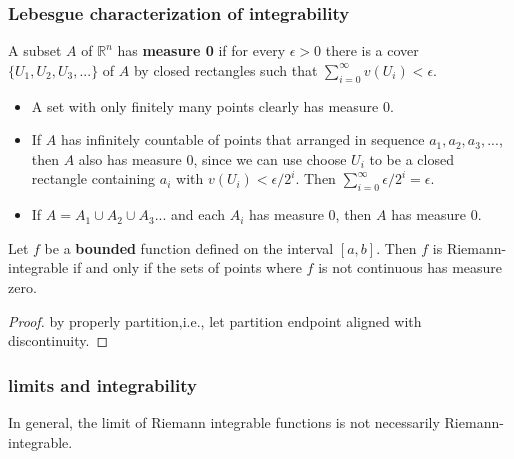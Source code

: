 \begin{refsection}
\subsubsection{Lebesgue characterization of integrability}

\begin{definition}\cite{spivak}
	A subset $A$ of $\mathbb{R}^n$ has \textbf{measure 0} if for every $\epsilon > 0 $ there is a cover $\{U_1,U_2,U_3,...\}$ of $A$ by closed rectangles such that $\sum_{i=0}^{\infty}v(U_i) < \epsilon$.	
\end{definition}

\begin{remark}\hfill
	\begin{itemize}
		\item A set with only finitely many points clearly has measure 0.
		\item  If $A$ has infinitely countable of points that arranged in sequence $a_1,a_2, a_3,...$, then $A$ also has measure 0, since we can use choose $U_i$ to be a closed rectangle containing $a_i$ with $v(U_i) < \epsilon/2^i$. Then $\sum_{i=0}^{\infty}\epsilon/2^i = \epsilon$.
		\item If $A = A_1\cup A_2 \cup A_3 ...$ and each $A_i$ has measure 0, then $A$ has measure 0.
	\end{itemize}
\end{remark}

\begin{theorem}\cite[242]{abbott2001understanding}
Let	$f$ be a \textbf{bounded} function defined on the interval $[a,b]$. Then $f$ is Riemann-integrable if and only if the sets of points where $f$ is not continuous has measure zero.
\end{theorem}
\begin{proof}
	by properly partition,i.e., let partition endpoint aligned with discontinuity. 
\end{proof}


\subsubsection{limits and integrability}





\begin{note}\cite[1]{cheng2008crash}
In general, the limit of Riemann integrable functions is not necessarily Riemann-integrable. 


\end{note}
\end{refsection}
